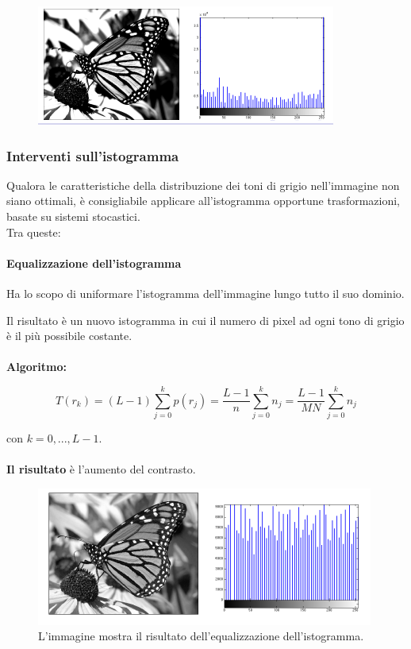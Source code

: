 \begin{itemize}
          \begin{figure}[H]
              \centering
              \includegraphics[width=\linewidth, keepaspectratio]{capitoli/immagini/imgs/alto-c.png}
          \end{figure}
\end{itemize}

\subsubsection{Interventi sull'istogramma}

Qualora le caratteristiche della distribuzione dei toni di grigio nell'immagine non siano ottimali, è consigliabile applicare
all'istogramma opportune trasformazioni, basate su sistemi stocastici.
\\Tra queste:

\paragraph{Equalizzazione dell'istogramma}

\begin{definition}
    Ha lo scopo di uniformare l'istogramma dell'immagine lungo tutto
    il suo dominio.
\end{definition}
Il risultato è un nuovo istogramma in cui il numero di pixel ad ogni
tono di grigio è il più possibile costante. \\\\
\textbf{Algoritmo:}

$$
    T(r_k) = (L-1)\sum_{j=0}^{k}p(r_j)=\frac{L-1}{n} \sum_{j=0}^{k}n_j = \frac{L-1}{MN}\sum_{j=0}^{k}n_j
$$

con $k=0,...,L-1$.
\\\\
\textbf{Il risultato} è l'aumento del contrasto.

\begin{figure}[H]
    \centering
    \includegraphics[width=\linewidth, keepaspectratio]{capitoli/immagini/imgs/eq-istogramma.png}
    \caption{L'immagine mostra il risultato dell'equalizzazione dell'istogramma.}
\end{figure}
